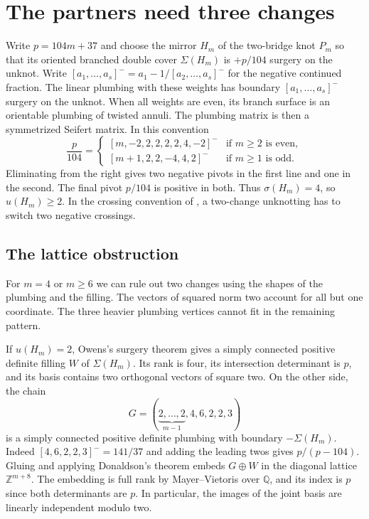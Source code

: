 \section{The partners need three changes}\label{sec:lower}

Write $p=104m+37$ and choose the mirror $H_m$ of the two-bridge knot $P_m$ so that its oriented branched double cover $\Sigma(H_m)$ is $+p/104$ surgery on the unknot. Write $[a_1,\ldots,a_s]^-=a_1-1/[a_2,\ldots,a_s]^-$ for the negative continued fraction. The linear plumbing with these weights has boundary $[a_1,\ldots,a_s]^-$ surgery on the unknot. When all weights are even, its branch surface is an orientable plumbing of twisted annuli. The plumbing matrix is then a symmetrized Seifert matrix. In this convention
\[
 \frac{p}{104}=
 \begin{cases}
  [m,-2,2,2,2,2,4,-2]^- & \text{if $m\geq 2$ is even},\\
  [m+1,2,2,-4,4,2]^- & \text{if $m\geq 1$ is odd}.
 \end{cases}
\]
Eliminating from the right gives two negative pivots in the first line and one in the second. The final pivot $p/104$ is positive in both. Thus $\sigma(H_m)=4$, so $u(H_m)\geq 2$. In the crossing convention of \cite{Owens}, a two-change unknotting has to switch two negative crossings.

\subsection{The lattice obstruction}\label{sub:lattice}
For $m=4$ or $m\geq6$ we can rule out two changes using the shapes of the plumbing and the filling. The vectors of squared norm two account for all but one coordinate. The three heavier plumbing vertices cannot fit in the remaining pattern.

If $u(H_m)=2$, Owens's surgery theorem \cite[Theorem~3 and Lemma~2.2]{Owens} gives a simply connected positive definite filling $W$ of $\Sigma(H_m)$. Its rank is four, its intersection determinant is $p$, and its basis contains two orthogonal vectors of square two. On the other side, the chain
\[
 G=(\underbrace{2,\ldots,2}_{m-1},4,6,2,2,3)
\]
is a simply connected positive definite plumbing with boundary $-\Sigma(H_m)$. Indeed $[4,6,2,2,3]^-=141/37$ and adding the leading twos gives $p/(p-104)$. Gluing and applying Donaldson's theorem \cite{Donaldson} embeds $G\oplus W$ in the diagonal lattice $\mathbb{Z}^{m+8}$. The embedding is full rank by Mayer--Vietoris over $\mathbb Q$, and its index is $p$ since both determinants are $p$. In particular, the images of the joint basis are linearly independent modulo two.

